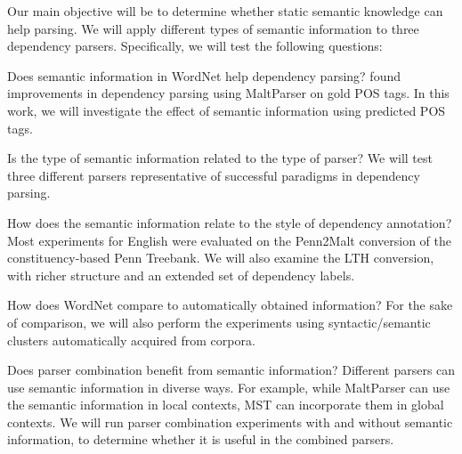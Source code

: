 \documentclass[11pt]{article}
\begin{document}

Our main objective will be to determine whether static semantic knowledge can help parsing. We will apply different types of semantic
information to three dependency parsers. Specifically, we will test the following questions:

\begin{compactitem}
\item Does semantic information in WordNet help dependency parsing?  found improvements  in dependency parsing using  MaltParser on gold POS tags. In this work, we will investigate the effect of semantic information using  predicted POS tags.
\item Is the type of semantic information related to the type of parser? We will test   
 three different parsers representative of successful paradigms in dependency parsing. 
\item How does the semantic information relate to the style of dependency annotation? Most  experiments for English were evaluated on the Penn2Malt conversion of the constituency-based Penn Treebank. We will also examine the LTH conversion, with richer structure and an extended set of dependency labels.
\item How does WordNet compare to automatically obtained information? For the sake of comparison, we will also perform the experiments using syntactic/semantic clusters automatically acquired from corpora. 
\item Does parser combination benefit from semantic information? 
Different parsers can use semantic information in diverse ways. 
For example, while MaltParser can use the semantic information in local contexts, MST can incorporate them in global contexts. We will run parser combination experiments with and without semantic information, to determine whether it is useful in the combined parsers. 
\end{compactitem}
\end{document}
